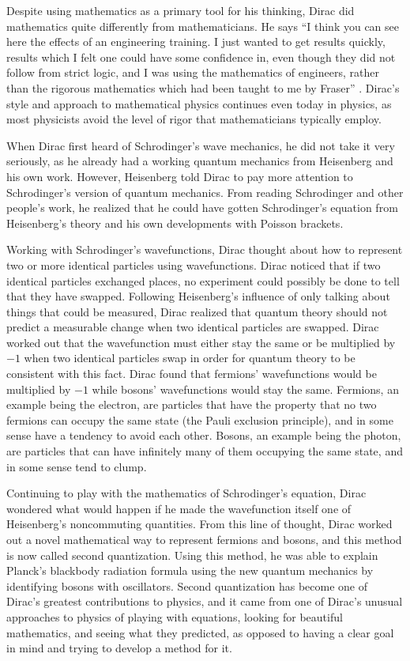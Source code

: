 \documentclass[12pt, oneside, letterpaper, fleqn]{article}
\begin{document}
Despite using mathematics as a primary tool for his thinking, Dirac did
mathematics quite differently from mathematicians. He says ``I think you
can see here the effects of an engineering training. I just wanted to
get results quickly, results which I felt one could have some confidence
in, even though they did not follow from strict logic, and I was using
the mathematics of engineers, rather than the rigorous mathematics which
had been taught to me by Fraser'' \cite[pg. 95]{strangest_man}. Dirac's
style and approach to mathematical physics continues even today in
physics, as most physicists avoid the level of rigor that mathematicians
typically employ.

When Dirac first heard of Schrodinger's wave mechanics, he did not take
it very seriously, as he already had a working quantum mechanics from
Heisenberg and his own work. However, Heisenberg told Dirac to pay more
attention to Schrodinger's version of quantum mechanics. From reading
Schrodinger and other people's work, he realized that he could have
gotten Schrodinger's equation from Heisenberg's theory and his own
developments with Poisson brackets.

Working with Schrodinger's wavefunctions, Dirac thought about how to
represent two or more identical particles using wavefunctions. Dirac
noticed that if two identical particles exchanged places, no experiment
could possibly be done to tell that they have swapped. Following
Heisenberg's influence of only talking about things that could be
measured, Dirac realized that quantum theory should not predict a
measurable change when two identical particles are swapped. Dirac worked
out that the wavefunction must either stay the same or be multiplied by
$-1$ when two identical particles swap in order for quantum theory to be
consistent with this fact. Dirac found that fermions' wavefunctions
would be multiplied by $-1$ while bosons' wavefunctions would stay the
same. Fermions, an example being the electron, are particles that have
the property that no two fermions can occupy the same state (the Pauli
exclusion principle), and in some sense have a tendency to avoid each
other.  Bosons, an example being the photon, are particles that can have
infinitely many of them occupying the same state, and in some sense tend
to clump.

Continuing to play with the mathematics of Schrodinger's equation, Dirac
wondered what would happen if he made the wavefunction itself one of
Heisenberg's noncommuting quantities. From this line of thought, Dirac
worked out a novel mathematical way to represent fermions and bosons,
and this method is now called second quantization. Using this method, he
was able to explain Planck's blackbody radiation formula using the new
quantum mechanics by identifying bosons with oscillators. Second
quantization has become one of Dirac's greatest contributions to
physics, and it came from one of Dirac's unusual approaches to physics
of playing with equations, looking for beautiful mathematics, and seeing
what they predicted, as opposed to having a clear goal in mind and
trying to develop a method for it.
\end{document}
